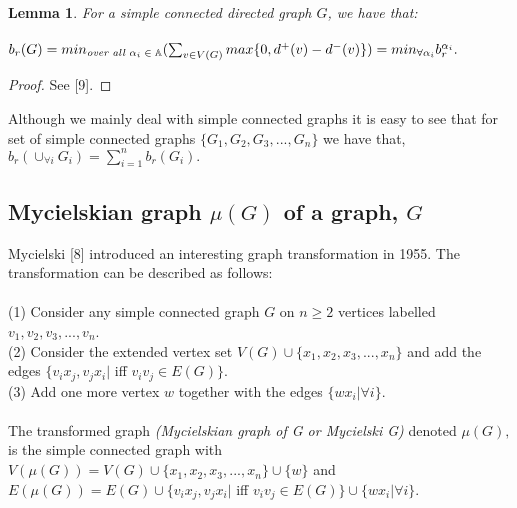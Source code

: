 \documentclass[11pt]{article}
\numberwithin{equation}{section}
\newtheorem{lemma}[theorem]{Lemma}
\begin{document}
{\begin{lemma}
For a simple connected directed graph $G$, we have that:\\ \\ $b_r(G) = min_{\emph{over all $\alpha_i \in \Bbb A$}}(\sum_{v \in V(G)}max\{0, d^+(v) - d^-(v)\}) = min_{\forall \alpha_i}b_r^{\alpha_i}.$
\end{lemma}
\begin{proof}
See [9].
\end{proof}
\noindent Although we mainly deal with simple connected graphs it is easy to see that for set of simple connected graphs $\{G_1, G_2, G_3, ..., G_n\}$ we have that, $b_r(\cup_{\forall i}G_i) = \sum\limits_{i=1}^{n}b_r(G_i).$
\subsection{Mycielskian graph $\mu(G)$ of a graph, $G$}
\noindent Mycielski [8]  introduced an interesting graph transformation in 1955. The transformation can be described as follows:\\ \\
(1) Consider any simple connected graph $G$ on $n \geq 2$ vertices labelled $v_1, v_2, v_3, ..., v_n$.\\
(2) Consider the extended vertex set $V(G) \cup \{x_1, x_2, x_3, ..., x_n\}$ and add the edges $\{v_ix_j, v_jx_i|$ iff $v_iv_j \in E(G)\}.$\\
(3) Add one more vertex $w$ together with the edges $\{wx_i| \forall i\}.$\\ \\
The transformed graph \emph{(Mycielskian graph of G or Mycielski G)} denoted $\mu(G),$ is the simple connected graph with $V(\mu(G)) = V(G) \cup \{x_1, x_2, x_3, ..., x_n\} \cup \{w\}$ and $E(\mu(G)) = E(G) \cup \{v_ix_j, v_jx_i|$ iff $v_iv_j \in E(G)\} \cup \{wx_i| \forall i\}.$ 
}
\end{document}
